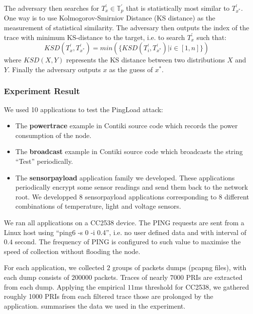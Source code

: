 \begin{description}
	The adversary then searches for $T^{\prime}_{x} \in \mathbb{T}^{\prime}_p$ that is statistically most similar to $T^{\prime}_{x^*}$. One way is to use Kolmogorov-Smirniov Distance (KS distance) as the measurement of statistical similarity. The adversary then  outputs the index of the trace with minimum KS-distance to the target, i.e. to search $T^{\prime}_x$ such that:
	\begin{equation}
		KSD( T^{\prime}_{x}, T^{\prime}_{x^*}) = min(\{KSD(T^{\prime}_i, T^{\prime}_{x^*}) | i \in [1,n]\})
	\end{equation}
	where $KSD(X, Y)$ represents the KS distance between two distributions $X$ and $Y$.	Finally the adversary outputs $x$ as the guess of $x^*$.
\end{description}

\subsubsection{Experiment Result}

We used 10 applications to test the PingLoad attack:
\begin{itemize}
	\item The \textbf{powertrace} example in Contiki source code which records the power consumption of the node.
	\item The \textbf{broadcast} example in Contiki source code which broadcasts the string ``Test'' periodically.
	\item The \textbf{sensorpayload} application family we developed. These applications periodically encrypt some sensor readings and send them back to the network root. We developped $8$ sensorpayload applications corresponding to $8$ different combinations of temperature, light and voltage sensors.
\end{itemize}

We  ran all applications on a CC2538 device. The PING requests are sent from a Linux host using ``ping6 -s 0 -i 0.4'', i.e. no user defined data and with interval of $0.4$ second. The frequency of PING is configured to such value to maximise the speed of collection without flooding the node.

For each application, we collected $2$ groups of packets dumps (pcapng files), with each dump consists of $200000$ packets. Traces of nearly $7000$ PRIs are extracted from each dump. Applying the empirical $11$ms threshold for CC2538, we gathered roughly 1000 PRIs from each filtered trace those are prolonged by the application.  summarises the data we used in the experiment.


